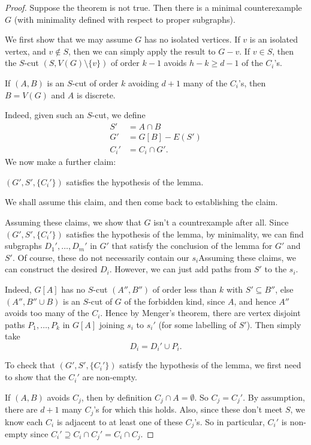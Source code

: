 \documentclass[a4paper]{article}
\begin{document}
\begin{proof}
  Suppose the theorem is not true. Then there is a minimal counterexample $G$ (with minimality defined with respect to proper subgraphs). 

  We first show that we may assume $G$ has no isolated vertices. If $v$ is an isolated vertex, and $v \not \in S$, then we can simply apply the result to $G - v$. If $v \in S$, then the $S$-cut $(S, V(G) \setminus \{v\})$ of order $k - 1$ avoids $h - k \geq d - 1$ of the $C_i$'s.

  \begin{claim}
    If $(A, B)$ is an $S$-cut of order $k$ avoiding $d + 1$ many of the $C_i$'s, then $B = V(G)$ and $A$ is discrete.
  \end{claim}
  Indeed, given such an $S$-cut, we define
  \begin{align*}
    S' &= A \cap B\\
    G' &= G[B] - E(S')\\
    C_i' &= C_i \cap G'.
  \end{align*}
  We now make a further claim:
  \begin{claim}
    $(G', S', \{C_i'\})$ satisfies the hypothesis of the lemma.
  \end{claim}
  We shall assume this claim, and then come back to establishing the claim.

  Assuming these claims, we show that $G$ isn't a countrexample after all. Since $(G', S', \{C_i'\})$ satisfies the hypothesis of the lemma, by minimality, we can find subgraphs $D_1', \ldots, D_m'$ in $G'$ that satisfy the conclusion of the lemma for $G'$ and $S'$. Of course, these do not necessarily contain our $s_i$Assuming these claims, we can construct the desired $D_i$. However, we can just add paths from $S'$ to the $s_i$.

  Indeed, $G[A]$ has no $S$-cut $(A'', B'')$ of order less than $k$ with $S' \subseteq B''$, else $(A'', B'' \cup B)$ is an $S$-cut of $G$ of the forbidden kind, since $A$, and hence $A''$ avoids too many of the $C_i$. Hence by Menger's theorem, there are vertex disjoint paths $P_1, \ldots, P_k$ in $G[A]$ joining $s_i$ to $s_i'$ (for some labelling of $S'$). Then simply take
  \[
    D_i = D_i' \cup P_i.
  \]
 
  \separator

  To check that $(G', S', \{C_i'\})$ satisfy the hypothesis of the lemma, we first need to show that the $C_i'$ are non-empty.

  If $(A, B)$ avoids $C_j$, then by definition $C_j \cap A = \emptyset$. So $C_j = C_j'$. By assumption, there are $d + 1$ many $C_j$'s for which this holds. Also, since these don't meet $S$, we know each $C_i$ is adjacent to at least one of these $C_j$'s. So in particular, $C_i'$ is non-empty since $C_i' \supseteq C_i \cap C_j' = C_i \cap C_j$.


\end{proof}
\end{document}
